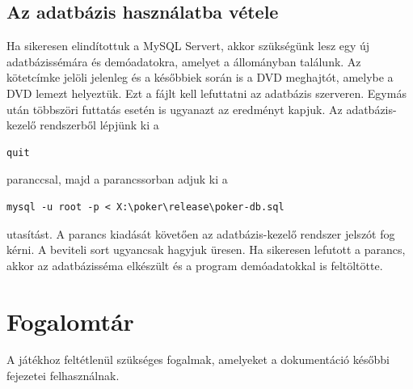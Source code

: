 \subsection{Az adatbázis használatba vétele}
Ha sikeresen elindítottuk a MySQL Servert, akkor szükségünk lesz egy új adatbázissémára és demóadatokra, amelyet a  állományban találunk. Az  kötetcímke jelöli jelenleg és a későbbiek során is a DVD meghajtót, amelybe a DVD lemezt helyeztük. Ezt a fájlt kell lefuttatni az adatbázis szerveren. Egymás után többszöri futtatás esetén is ugyanazt az eredményt kapjuk. Az adatbázis-kezelő rendszerből lépjünk ki a 
\begin{Verbatim}[xleftmargin=.5in]
quit
\end{Verbatim}
paranccsal, majd a parancssorban adjuk ki a
 \begin{Verbatim}[xleftmargin=.5in]
mysql -u root -p < X:\poker\release\poker-db.sql
\end{Verbatim}
utasítást. A parancs kiadását követően az adatbázis-kezelő rendszer jelszót fog kérni. A beviteli sort ugyancsak hagyjuk üresen. Ha sikeresen lefutott a parancs, akkor az adatbázisséma elkészült és a program demóadatokkal is feltöltötte.

\section{Fogalomtár}
A játékhoz feltétlenül szükséges fogalmak, amelyeket a dokumentáció későbbi fejezetei felhasználnak.
